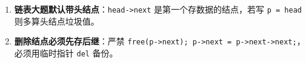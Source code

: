 \documentclass[10pt,a4paper]{ctexart}
\begin{document}
\par\addvspace{3pt}\par\addvspace{3pt}


\begin{enumerate}

\item \textbf{链表大题默认带头结点}：\texttt{head->next} 是第一个存数据的结点，若写 \texttt{p = head} 则多算头结点垃圾值。

\item \textbf{删除结点必须先存后继}：严禁 \texttt{free(p->next); p->next = p->next->next;}，必须用临时指针 \texttt{del} 备份。

\end{enumerate}
\end{document}
